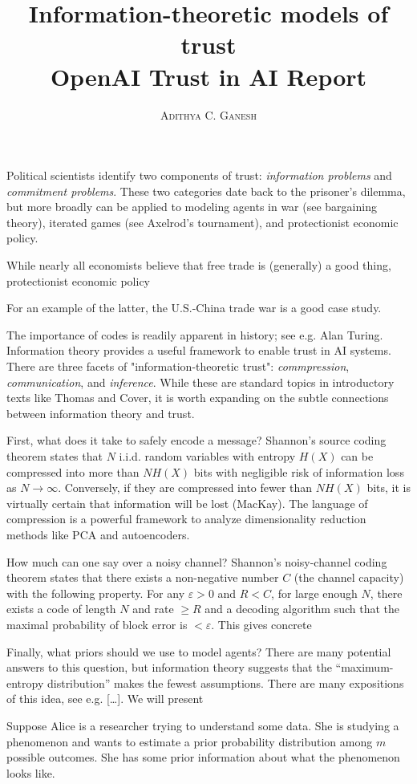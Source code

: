 \documentclass[11pt]{article}
\title{Information-theoretic models of trust \\ \vspace{0.3cm} OpenAI Trust in AI Report}
\author{\textsc{Adithya C. Ganesh}}
\begin{document}
\noindent Political scientists identify two components of trust: {\it information problems} and {\it commitment problems}.  These two categories date back to the prisoner's dilemma, but more broadly can be applied to modeling agents in war (see bargaining theory), iterated games (see Axelrod's tournament), and protectionist economic policy.

While nearly all economists believe that free trade is (generally) a good thing, protectionist economic policy

For an example of the latter, the U.S.-China trade war is a good case study.

The importance of codes is readily apparent in history; see e.g. Alan Turing.  Information theory provides a useful framework to enable trust in AI systems.  There are three facets of "information-theoretic trust": {\it commpression}, {\it communication}, and {\it inference}.  While these are standard topics in introductory texts like Thomas and Cover, it is worth expanding on the subtle connections between information theory and trust.

First, what does it take to safely encode a message?  Shannon's source coding theorem states that $N$ i.i.d. random variables with entropy $H(X)$ can be compressed into more than $N H(X)$ bits with negligible risk of information loss as $N \to \infty$.  Conversely, if they are compressed into fewer than $N H(X)$ bits, it is virtually certain that information will be lost (MacKay).  The language of compression is a powerful framework to analyze dimensionality reduction methods like PCA and autoencoders.

How much can one say over a noisy channel?  Shannon's noisy-channel coding theorem states that there exists a non-negative number $C$ (the channel capacity) with the following property.  For any $\varepsilon > 0$ and $R < C$, for large enough $N$, there exists a code of length $N$ and rate $\geq R$ and a decoding algorithm such that the maximal probability of block error is $< \varepsilon$.  This gives concrete 

Finally, what priors should we use to model agents?  There are many potential answers to this question, but information theory suggests that the ``maximum-entropy distribution'' makes the fewest assumptions.  There are many expositions of this idea, see e.g. [\dots].  We will present

Suppose Alice is a researcher trying to understand some data.  She is studying a phenomenon and wants to estimate a prior probability distribution among $m$ possible outcomes. She has some prior information about what the phenomenon looks like.  
\end{document}
